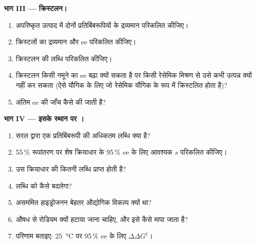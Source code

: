 \begin{problem}
\medskip\noindent\textbf{भाग III --- क्रिस्टलन।}
\begin{enumerate}[resume]
  \item अपरिष्कृत उत्पाद में दोनों प्रतिबिंबरूपियों के द्रव्यमान परिकलित कीजिए।
  \item क्रिस्टलों का द्रव्यमान और ee परिकलित कीजिए।
  \item क्रिस्टलन की लब्धि परिकलित कीजिए।
  \item क्रिस्टलन किसी नमूने का ee बढ़ा क्यों सकता है पर किसी रेसेमिक मिश्रण से उसे कभी उत्पन्न क्यों नहीं कर सकता
        (ऐसे यौगिक के लिए जो रेसेमिक यौगिक के रूप में क्रिस्टलित होता है)?
  \item अंतिम ee की जाँच कैसे की जाती है?
\end{enumerate}

\medskip\noindent\textbf{भाग IV --- इसके स्थान पर ।}
\begin{enumerate}[resume]
  \item सरल  द्वारा एक प्रतिबिंबरूपी की अधिकतम लब्धि क्या है?
  \item 55\,\% रूपांतरण पर शेष क्रियाधार के 95\,\% ee के लिए आवश्यक $s$ परिकलित कीजिए।
  \item उस क्रियाधार की कितनी लब्धि प्राप्त होती है?
  \item {} लब्धि को कैसे बदलेगा?
  \item असममित हाइड्रोजनन बेहतर औद्योगिक विकल्प क्यों था?
  \item औषध से रोडियम क्यों हटाया जाना चाहिए, और इसे कैसे मापा जाता है?
  \item परिणाम बताइए: \qty{25}{\celsius} पर 95\,\% ee के लिए $\Delta\Delta G^\ddagger$।
\end{enumerate}
\end{problem}
